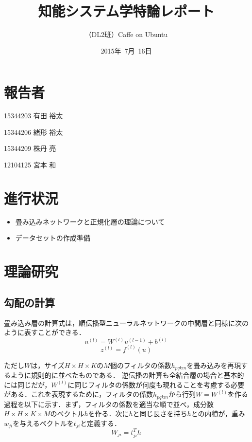\documentclass[a4paper,10pt]{jsarticle}
\title{知能システム学特論レポート}
\author{
（DL2班）Caffe on Ubuntu\\
}
\date{2015年\ 7月\ 16日}
\begin{document}
\maketitle
\section{報告者}
\begin{list}{}{}
 \item 15344203\hspace{0.5cm} 有田 裕太
 \item 15344206\hspace{0.5cm} 緒形 裕太
 \item 15344209\hspace{0.5cm} 株丹 亮
 \item 12104125\hspace{0.5cm} 宮本 和
\end{list}

\section{進行状況}

\begin{itemize}
\item 畳み込みネットワークと正規化層の理論について
\item データセットの作成準備
\end{itemize}

\section{理論研究}
\subsection{勾配の計算}
畳み込み層の計算式は，順伝播型ニューラルネットワークの中間層と同様に次のように表すことができる．
\begin{equation}
 u^{(l)} = W^{(l)} u^{(l-1)} + b^{(l)}
\end{equation}
\begin{equation}
 z^{(l)} = f^{(l)} (u)
\end{equation}

ただし$W$は，サイズ$H\times H\times K$の$M$個のフィルタの係数$h_{pqkm}$を畳み込みを再現するように規則的に並べたものである．
逆伝播の計算も全結合層の場合と基本的には同じだが，$W^{(l)}$に同じフィルタの係数が何度も現れることを考慮する必要がある．これを表現するために，フィルタの係数$h_{pqkm}$から行列$W = W^{(l)}$を作る過程を以下に示す．まず，フィルタの係数を適当な順で並べ，成分数$H\times H\times K\times M$のベクトル$h$を作る．次に$h$と同じ長さを持ち$h$との内積が，重み$w_{ji}$を与えるベクトルを$t_{ji}$と定義する．
\begin{equation}
 W_{ji} = t_{ji}^{T} h
\end{equation}
\end{document}

